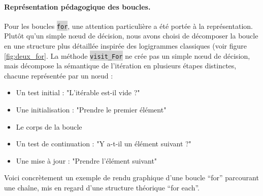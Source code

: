 \documentclass[11pt,a4paper]{article}
\newcommand{\code}[1]{\colorbox{lightgray}{\texttt{\small #1}}}
\begin{document}
\paragraph{Représentation pédagogique des boucles.} Pour les boucles \code{for}, une attention particulière a été portée
 à la représentation. Plutôt qu'un simple nœud de décision, nous avons choisi de décomposer la boucle en une structure
  plus détaillée inspirée des logigrammes classiques (voir figure \ref{fig:deux_for}.
  La méthode \code{visit\_For} ne crée pas un simple nœud de décision, mais décompose la sémantique de l'itération en plusieurs étapes distinctes, chacune représentée par un nœud :
\begin{itemize}
    \item Un test initial : "L'itérable est-il vide ?"
    \item Une initialisation : "Prendre le premier élément"
    \item Le corps de la boucle
    \item Un test de continuation : "Y a-t-il un élément suivant ?"
    \item Une mise à jour : "Prendre l'élément suivant"
\end{itemize}
Voici concrètement un exemple de rendu graphique d'une boucle ``for'' parcourant une chaîne, mis en regard d'une structure théorique ``for each''.
\end{document}
